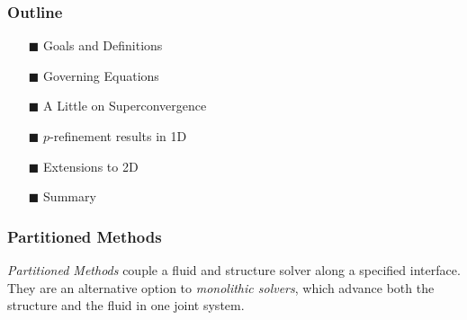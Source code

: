 \documentclass[8pt]{beamer}
\begin{document}

\begin{frame}
    \frametitle{Outline}
    \begin{itemize}
    \item[$\blacksquare$] Goals and Definitions                               \\
    \item[$\blacksquare$] Governing Equations                                 \\
    \item[$\blacksquare$] A Little on Superconvergence                        \\
    \item[$\blacksquare$] \(p\)-refinement results in 1D                      \\
    \item[$\blacksquare$] Extensions to 2D                                    \\
    \item[$\blacksquare$] Summary                                             \\
    \end{itemize}
\end{frame}

\begin{frame}
    \frametitle{Partitioned Methods}
    \emph{Partitioned Methods} couple a fluid and structure solver along a
    specified interface. They are an alternative option to \emph{monolithic
    solvers}, which advance both the structure and the fluid in one joint
    system.
\end{frame}
\end{document}
